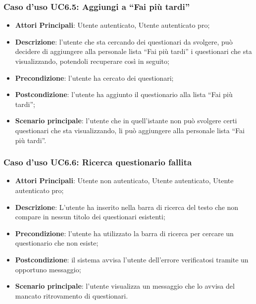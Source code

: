 \subsubsection{Caso d'uso UC6.5: Aggiungi a ``Fai più tardi''}
\label{UC6.5}
\begin{itemize}
\item\textbf{Attori Principali}: Utente autenticato, Utente autenticato pro;
\item\textbf{Descrizione}: l'utente che sta cercando dei questionari da svolgere, può decidere di aggiungere alla personale lista ``Fai più tardi'' i questionari che sta visualizzando, potendoli recuperare così in seguito;
\item\textbf{Precondizione}: l'utente ha cercato dei questionari;
\item\textbf{Postcondizione}: l'utente ha aggiunto il questionario alla lista ``Fai più tardi'';
\item\textbf{Scenario principale}: l'utente che in quell'istante non può svolgere certi questionari che sta visualizzando, li può aggiungere alla personale lista ``Fai più tardi''.
\end{itemize}

\subsubsection{Caso d'uso UC6.6: Ricerca questionario fallita}
\label{UC6.6}
\begin{itemize}
\item\textbf{Attori Principali}: Utente non autenticato, Utente autenticato, Utente autenticato pro;
\item\textbf{Descrizione}: L'utente ha inserito nella barra di ricerca del testo che non compare in nessun titolo dei questionari esistenti;
\item\textbf{Precondizione}: l'utente ha utilizzato la barra di ricerca per cercare un questionario che non esiste;
\item\textbf{Postcondizione}: il sistema avvisa l'utente dell'errore verificatosi tramite un opportuno messaggio;
\item\textbf{Scenario principale}: l'utente visualizza un messaggio che lo avvisa del mancato ritrovamento di questionari.
\end{itemize}


